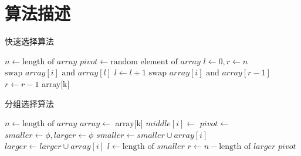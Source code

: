 \section{算法描述}

\begin{algorithm}
  \caption{快速选择算法}
  \begin{algorithmic}[1]
    \State $n \gets \text{length of } array$
    \State $pivot \gets \text{random element of } array$
    \State $l \gets 0, r \gets n$
        \State $\text{swap } array[i] \text{ and } array[l]$
        \State $l \gets l + 1$
      \EndIf
    \EndFor
        \State $\text{swap } array[i] \text{ and } array[r - 1]$
        \State $r \gets r - 1$
      \EndIf
    \EndFor
      \State \Return {}
      \State \Return {}
    \Else
      \State \Return array[k]
    \EndIf
  \EndFunction
  \end{algorithmic}
\end{algorithm}

\begin{algorithm}
  \caption{分组选择算法}
  \begin{algorithmic}[1]
    \State $n \gets \text{length of } array$
      \State $array \gets$ 
      \State \Return array[k]
    \EndIf
      \State $middle[i] \gets$ 
    \EndFor
    \State $pivot \gets$ 
    \State $smaller \gets \phi, larger \gets \phi$
        \State $smaller \gets smaller \cup array[i]$
        \State $larger \gets larger \cup array[i]$
      \EndIf
    \EndFor
    \State $l \gets \text{length of } smaller$
    \State $r \gets n - \text{length of } larger$
      \State \Return {}
      \State \Return {}
    \Else
      \State \Return $pivot$
    \EndIf
  \EndFunction
  \end{algorithmic}
\end{algorithm}
